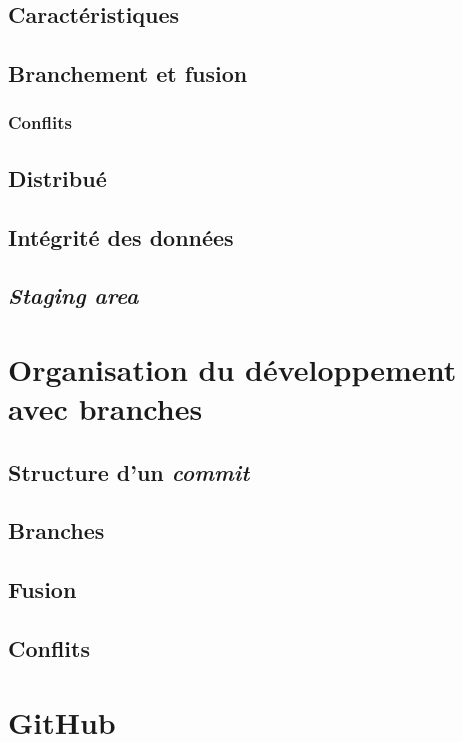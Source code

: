 \documentclass[11pt,a4paper]{article}
\begin{document}
\subsection{Caractéristiques}

\subsection{Branchement et fusion}

\subsubsection{Conflits}

\subsection{Distribué}

\subsection{Intégrité des données}

\subsection{\textit{Staging area}}

\section{Organisation du développement avec branches}

\subsection{Structure d'un \textit{commit}}

\subsection{Branches}

\subsection{Fusion}

\subsection{Conflits}

\section{GitHub}
\end{document}
